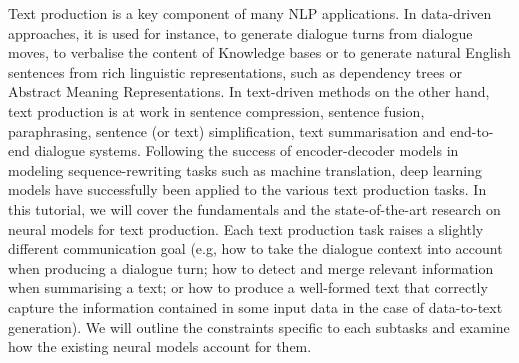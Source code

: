 Text production is a key component of many NLP applications.  In data-driven approaches, it is used for instance, to generate dialogue turns from dialogue moves, to verbalise the content of Knowledge bases or to generate natural English sentences from rich linguistic representations, such as dependency trees or Abstract Meaning Representations.  In text-driven methods on the other hand, text production is at work in sentence compression, sentence fusion, paraphrasing, sentence (or text) simplification, text summarisation and end-to-end dialogue systems. Following the success of encoder-decoder models in modeling sequence-rewriting tasks such as machine translation, deep learning models have successfully been applied to the various text production tasks. In this tutorial, we will cover the fundamentals and the state-of-the-art research on neural models for text production. Each text production task raises a slightly different communication goal (e.g, how to take the dialogue context into account when producing a dialogue turn; how to detect and merge relevant information when summarising a text; or how to produce a well-formed text that correctly capture the information contained in some input data in the case of data-to-text generation).  We will outline the constraints specific to each subtasks and examine how the existing neural models account for them.
